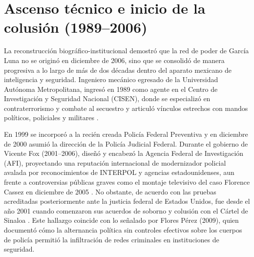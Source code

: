 

\section{Ascenso técnico e inicio de la colusión (1989--2006)}

La reconstrucción biográfico-institucional demostró que la red de poder de García Luna no se originó en diciembre de 2006, sino que se consolidó de manera progresiva a lo largo de más de dos décadas dentro del aparato mexicano de inteligencia y seguridad. Ingeniero mecánico egresado de la Universidad Autónoma Metropolitana, ingresó en 1989 como agente en el Centro de Investigación y Seguridad Nacional (CISEN), donde se especializó en contraterrorismo y combate al secuestro y articuló vínculos estrechos con mandos políticos, policiales y militares \citep{castillog2023,expansion2019}.

En 1999 se incorporó a la recién creada Policía Federal Preventiva y en diciembre de 2000 asumió la dirección de la Policía Judicial Federal. Durante el gobierno de Vicente Fox (2001--2006), diseñó y encabezó la Agencia Federal de Investigación (AFI), proyectando una reputación internacional de modernizador policial avalada por reconocimientos de INTERPOL y agencias estadounidenses, aun frente a controversias públicas graves como el montaje televisivo del caso Florence Cassez en diciembre de 2005 \citep{astorga2007,expansion2019}. No obstante, de acuerdo con las pruebas acreditadas posteriormente ante la justicia federal de Estados Unidos, fue desde el año 2001 cuando comenzaron sus acuerdos de soborno y colusión con el Cártel de Sinaloa \citep{doj2024garcialuna,pastrana2024}. Este hallazgo coincide con lo señalado por Flores Pérez (2009), quien documentó cómo la alternancia política sin controles efectivos sobre los cuerpos de policía permitió la infiltración de redes criminales en instituciones de seguridad.

